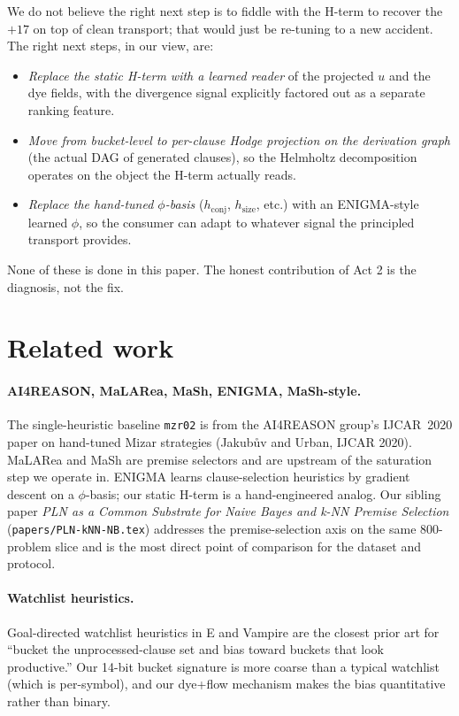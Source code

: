 \documentclass[11pt]{article}
\newcommand{\lpath}[1]{\texttt{\nolinkurl{#1}}}
\begin{document}
We do not believe the right next step is to fiddle with the H-term to
recover the $+17$ on top of clean transport; that would just be
re-tuning to a new accident. The right next steps, in our view, are:
\begin{itemize}
\item \emph{Replace the static H-term with a learned reader} of the
      projected $u$ and the dye fields, with the divergence signal
      explicitly factored out as a separate ranking feature.
\item \emph{Move from bucket-level to per-clause Hodge projection on the
      derivation graph} (the actual DAG of generated clauses), so the
      Helmholtz decomposition operates on the object the H-term actually
      reads.
\item \emph{Replace the hand-tuned $\phi$-basis} ($h_\mathrm{conj}$,
      $h_\mathrm{size}$, etc.) with an ENIGMA-style learned $\phi$, so
      the consumer can adapt to whatever signal the principled transport
      provides.
\end{itemize}
None of these is done in this paper. The honest contribution of Act 2 is
the diagnosis, not the fix.

\section{Related work}\label{sec:related}

\paragraph{AI4REASON, MaLARea, MaSh, ENIGMA, MaSh-style.}
The single-heuristic baseline \texttt{mzr02} is from the AI4REASON
group's IJCAR~2020 paper on hand-tuned Mizar strategies
(Jakub\r{u}v and Urban, IJCAR 2020). MaLARea and MaSh are premise
selectors and are upstream of the saturation step we operate in.
ENIGMA learns clause-selection heuristics by gradient descent on a
$\phi$-basis; our static H-term is a hand-engineered analog. Our
sibling paper \emph{PLN as a Common Substrate for Naive Bayes and k-NN
Premise Selection} (\lpath{papers/PLN-kNN-NB.tex}) addresses the
premise-selection axis on the same 800-problem slice and is the most
direct point of comparison for the dataset and protocol.

\paragraph{Watchlist heuristics.}
Goal-directed watchlist heuristics in E and Vampire are the closest
prior art for ``bucket the unprocessed-clause set and bias toward
buckets that look productive.'' Our 14-bit bucket signature is more
coarse than a typical watchlist (which is per-symbol), and our
dye+flow mechanism makes the bias quantitative rather than binary.
\end{document}
